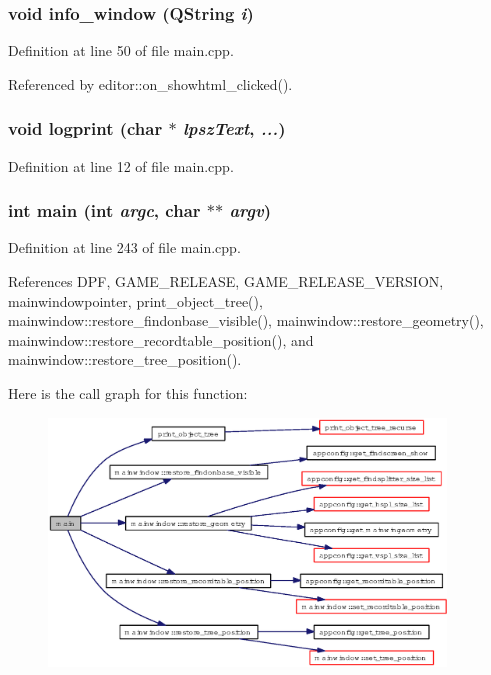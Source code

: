 \subsubsection{\setlength{\rightskip}{0pt plus 5cm}void info\_\-window (QString {\em i})}\label{main_8cpp_11a7110d2888630c2a28e17fcd3199fd}




Definition at line 50 of file main.cpp.

Referenced by editor::on\_\-showhtml\_\-clicked().
\subsubsection{\setlength{\rightskip}{0pt plus 5cm}void logprint (char $\ast$ {\em lpsz\-Text},  {\em ...})}\label{main_8cpp_e8160c24b0b45e234c5ad305d0d31a3b}




Definition at line 12 of file main.cpp.
\subsubsection{\setlength{\rightskip}{0pt plus 5cm}int main (int {\em argc}, char $\ast$$\ast$ {\em argv})}\label{main_8cpp_3c04138a5bfe5d72780bb7e82a18e627}




Definition at line 243 of file main.cpp.

References DPF, GAME\_\-RELEASE, GAME\_\-RELEASE\_\-VERSION, mainwindowpointer, print\_\-object\_\-tree(), mainwindow::restore\_\-findonbase\_\-visible(), mainwindow::restore\_\-geometry(), mainwindow::restore\_\-recordtable\_\-position(), and mainwindow::restore\_\-tree\_\-position().

Here is the call graph for this function:\begin{figure}[H]
\begin{center}
\leavevmode
\includegraphics[width=299pt]{main_8cpp_3c04138a5bfe5d72780bb7e82a18e627_cgraph}
\end{center}
\end{figure}
